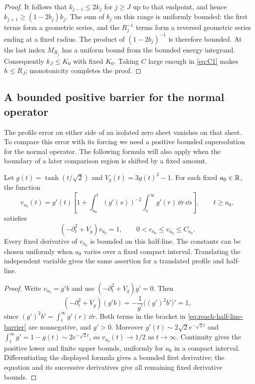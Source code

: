 \begin{proof}
It follows that $k_{j-1}\le2k_j$ for $j\ge J$ up to that endpoint,
and hence $k_{j+1}\ge(1-2b_j)k_j$.  The sum of $b_j$ on this
range is uniformly bounded: the first terms form a geometric series,
and the $R_j^{-1}$ terms form a reversed geometric series ending at
a fixed radius.  The product of $(1-2b_j)^{-1}$ is therefore bounded.
At the last index $M_{R_j}$ has a uniform bound from the bounded
energy integrand.  Consequently $k_J\le K_0$ with fixed $K_0$.
Taking $C$ large enough in \eqref{eq:C1} makes $h\le R_J$;
monotonicity completes the proof.
\end{proof}

\subsection{A bounded positive barrier for the normal operator}

The profile error on either side of an isolated zero sheet vanishes
on that sheet.  To compare this error with its forcing we need a
positive bounded supersolution for the normal operator.  The following
formula will also apply when the boundary of a later comparison region
is shifted by a fixed amount.

\begin{lemma}\label{lem:reach-half-line-barrier}
Let $g(t)=\tanh(t/\sqrt2)$ and $V_g(t)=3g(t)^2-1$.
For each fixed $a_0\in\mathbb R$, the function
\begin{equation}\label{eq:reach-half-line-barrier}
 v_{a_0}(t)=g'(t)\left[1+\int_{a_0}^t(g'(s))^{-2}
                         \int_s^\infty g'(r)\,\dd r\,\dd s\right],
 \qquad t\ge a_0,
\end{equation}
satisfies
\[
 (-\partial_t^2+V_g)v_{a_0}=1,\qquad
 0<c_{a_0}\le v_{a_0}\le C_{a_0}.
\]
Every fixed derivative of $v_{a_0}$ is bounded on this half-line.
The constants can be chosen uniformly when $a_0$ varies over a fixed
compact interval.  Translating the independent variable gives the
same assertion for a translated profile and half-line.
\end{lemma}

\begin{proof}
Write $v_{a_0}=g'b$ and use
$(-\partial_t^2+V_g)g'=0$.  Then
\[
 (-\partial_t^2+V_g)(g'b)
 =-\frac{1}{g'}\bigl((g')^2b'\bigr)'=1,
\]
since $(g')^2b'=\int_t^\infty g'(r)\,\dd r$.
Both terms in the bracket in \eqref{eq:reach-half-line-barrier} are
nonnegative, and $g'>0$.  Moreover
$g'(t)\sim2\sqrt2e^{-\sqrt2t}$ and
$\int_t^\infty g'=1-g(t)\sim2e^{-\sqrt2t}$, so
$v_{a_0}(t)\to1/2$ as $t\to\infty$.
Continuity gives the positive lower and finite upper bounds, uniformly
for $a_0$ in a compact interval.  Differentiating the displayed formula
gives a bounded first derivative; the equation and its successive
derivatives give all remaining fixed derivative bounds.
\end{proof}

